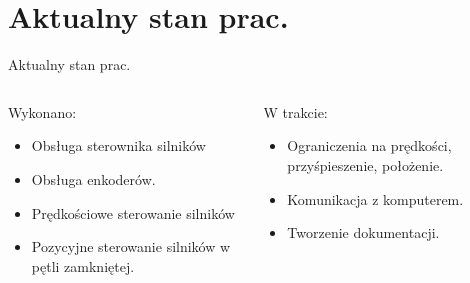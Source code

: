 \documentclass{beamer}
\begin{document}
\section{Aktualny stan prac.}
\begin{frame}{Aktualny stan prac.}
	\begin{columns}[T]
		\begin{column}{.5\textwidth}
			\textcolor{ok}{Wykonano:}
			\begin{itemize}
				\item Obsługa sterownika silników
				\item Obsługa enkoderów.
				\item Prędkościowe sterowanie silników
				\item Pozycyjne sterowanie silników w pętli zamkniętej.
			\end{itemize}
		\end{column}
		\begin{column}{.5\textwidth}
			\textcolor{nok}{W trakcie:}
			\begin{itemize}
				\item Ograniczenia na prędkości, przyśpieszenie, położenie.
				\item Komunikacja z komputerem.
				\item Tworzenie dokumentacji.
			\end{itemize}
		\end{column}
	\end{columns}
\end{frame}
\end{document}
